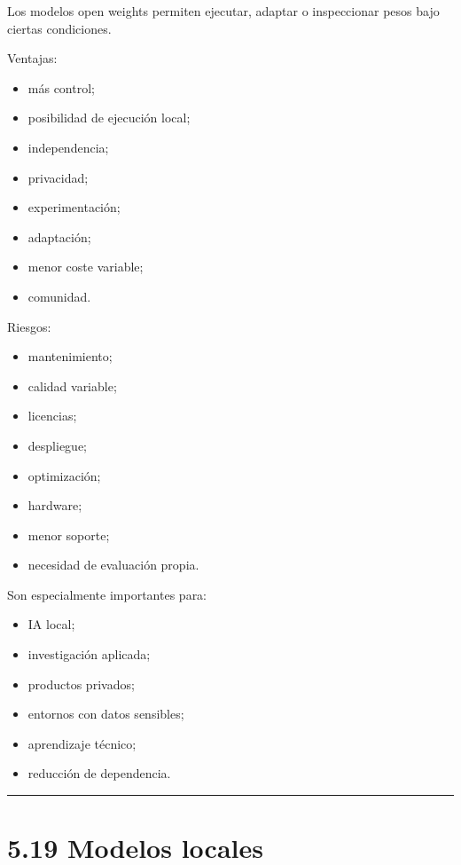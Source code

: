 Los modelos open weights permiten ejecutar, adaptar o inspeccionar pesos
bajo ciertas condiciones.

Ventajas:

\begin{itemize}
\tightlist
\item
  más control;
\item
  posibilidad de ejecución local;
\item
  independencia;
\item
  privacidad;
\item
  experimentación;
\item
  adaptación;
\item
  menor coste variable;
\item
  comunidad.
\end{itemize}

Riesgos:

\begin{itemize}
\tightlist
\item
  mantenimiento;
\item
  calidad variable;
\item
  licencias;
\item
  despliegue;
\item
  optimización;
\item
  hardware;
\item
  menor soporte;
\item
  necesidad de evaluación propia.
\end{itemize}

Son especialmente importantes para:

\begin{itemize}
\tightlist
\item
  IA local;
\item
  investigación aplicada;
\item
  productos privados;
\item
  entornos con datos sensibles;
\item
  aprendizaje técnico;
\item
  reducción de dependencia.
\end{itemize}

\begin{center}\rule{0.5\linewidth}{0.5pt}\end{center}

\section{5.19 Modelos locales}\label{modelos-locales-1}

